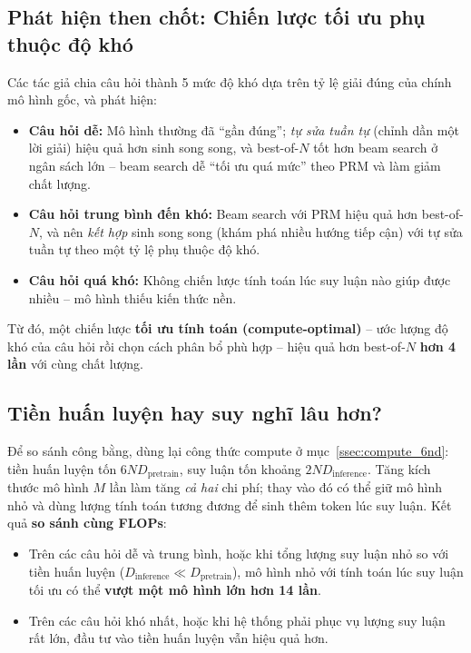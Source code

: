 \begin{center}
\label{fig:ttc_search}
\end{center}

\subsection{Phát hiện then chốt: Chiến lược tối ưu phụ thuộc độ khó}
\label{ssec:ttc_difficulty}
Các tác giả chia câu hỏi thành 5 mức độ khó dựa trên tỷ lệ giải đúng của chính mô hình gốc, và phát hiện:
\begin{itemize}
	\item \textbf{Câu hỏi dễ:} Mô hình thường đã “gần đúng”; \emph{tự sửa tuần tự} (chỉnh dần một lời giải) hiệu quả hơn sinh song song, và best-of-$N$ tốt hơn beam search ở ngân sách lớn -- beam search dễ “tối ưu quá mức” theo PRM và làm giảm chất lượng.
	\item \textbf{Câu hỏi trung bình đến khó:} Beam search với PRM hiệu quả hơn best-of-$N$, và nên \emph{kết hợp} sinh song song (khám phá nhiều hướng tiếp cận) với tự sửa tuần tự theo một tỷ lệ phụ thuộc độ khó.
	\item \textbf{Câu hỏi quá khó:} Không chiến lược tính toán lúc suy luận nào giúp được nhiều -- mô hình thiếu kiến thức nền.
\end{itemize}
Từ đó, một chiến lược \textbf{tối ưu tính toán (compute-optimal)} -- ước lượng độ khó của câu hỏi rồi chọn cách phân bổ phù hợp -- hiệu quả hơn best-of-$N$ \textbf{hơn 4 lần} với cùng chất lượng.

\subsection{Tiền huấn luyện hay suy nghĩ lâu hơn?}
\label{ssec:pretrain_vs_ttc}
Để so sánh công bằng, dùng lại công thức compute ở mục~\ref{ssec:compute_6nd}: tiền huấn luyện tốn $6ND_{\text{pretrain}}$, suy luận tốn khoảng $2ND_{\text{inference}}$. Tăng kích thước mô hình $M$ lần làm tăng \emph{cả hai} chi phí; thay vào đó có thể giữ mô hình nhỏ và dùng lượng tính toán tương đương để sinh thêm token lúc suy luận. Kết quả \textbf{so sánh cùng FLOPs}:
\begin{itemize}
	\item Trên các câu hỏi dễ và trung bình, hoặc khi tổng lượng suy luận nhỏ so với tiền huấn luyện ($D_{\text{inference}} \ll D_{\text{pretrain}}$), mô hình nhỏ với tính toán lúc suy luận tối ưu có thể \textbf{vượt một mô hình lớn hơn 14 lần}.
	\item Trên các câu hỏi khó nhất, hoặc khi hệ thống phải phục vụ lượng suy luận rất lớn, đầu tư vào tiền huấn luyện vẫn hiệu quả hơn.
\end{itemize}

